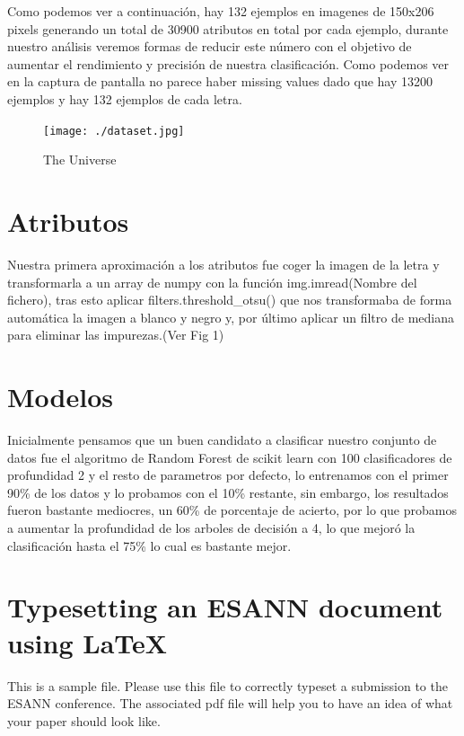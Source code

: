 \documentclass[0pt]{esannV2}
\begin{document}
\begin{flushleft}
Como podemos ver a continuaci\'on, hay 132 ejemplos en imagenes de 150x206 pixels generando un total de 30900 atributos en total por cada ejemplo, durante nuestro análisis veremos formas de reducir este n\'umero con el objetivo de aumentar el rendimiento y precisi\'on de nuestra clasificaci\'on. Como podemos ver en la captura de pantalla no parece haber missing values dado que hay 13200 ejemplos y hay 132 ejemplos de cada letra.
\end{flushleft}

\begin{figure}[htbp]
\centering
    \texttt{[image: ./dataset.jpg]}
\caption{The Universe}
\end{figure}


\section{Atributos}
Nuestra primera aproximaci\'on a los atributos fue coger la imagen de la letra y transformarla a un array de numpy con la funci\'on img.imread(Nombre del fichero), tras esto aplicar filters.threshold\_otsu() que nos transformaba de forma autom\'atica  la imagen a blanco y negro y, por \'ultimo aplicar un filtro de mediana para eliminar las impurezas.(Ver Fig 1)


\section{Modelos}
Inicialmente pensamos que un buen candidato a clasificar nuestro conjunto de datos fue el algoritmo de Random Forest de scikit learn con 100 clasificadores de profundidad 2 y el resto de parametros por defecto, lo entrenamos con el primer 90\% de los datos y lo probamos con el 10\% restante, sin embargo, los resultados fueron bastante mediocres, un 60\% de porcentaje de acierto, por lo que probamos a aumentar la profundidad de los arboles de decisi\'on a 4, lo que mejor\'o la clasificaci\'on hasta el 75\% lo cual es bastante mejor.

\section{Typesetting an ESANN document using \LaTeX}

This is a sample file. Please use this file to correctly typeset a
submission to the ESANN conference. The associated pdf file will
help you to have an idea of what your paper should look like.
\end{document}
